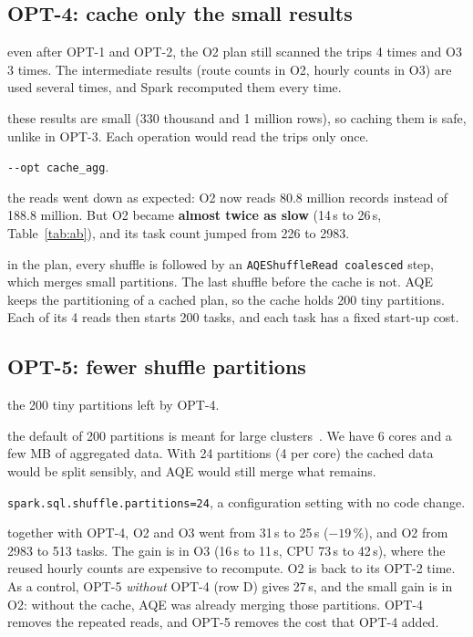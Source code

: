 \documentclass[sigconf]{acmart}
\newcommand{\opt}[1]{\texttt{-{}-opt #1}}
\newenvironment{steps}{\begin{description}[nosep, leftmargin=0pt, font=\normalfont\itshape]}{\end{description}}
\begin{document}
\subsection{OPT-4: cache only the small results}
\begin{steps}
  \item[What we saw:] even after OPT-1 and OPT-2, the O2 plan still scanned the trips 4 times and O3 3 times. The
    intermediate results (route counts in O2, hourly counts in O3) are used several times, and Spark recomputed them
    every time.
  \item[What we expected:] these results are small (330 thousand and 1 million rows), so caching them is safe, unlike
    in OPT-3. Each operation would read the trips only once.
  \item[What we changed:] \opt{cache\_agg}.
  \item[What happened:] the reads went down as expected: O2 now reads 80.8 million records instead of 188.8 million.
    But O2 became \textbf{almost twice as slow} (14\,s to 26\,s, Table~\ref{tab:ab}), and its task count jumped from
    226 to 2983.
  \item[Why:] in the plan, every shuffle is followed by an \texttt{AQEShuffleRead coalesced} step, which merges
    small partitions. The last shuffle before the cache is not. AQE~\cite{sparktuning} keeps the partitioning of a
    cached plan, so the cache holds 200 tiny partitions. Each of its 4 reads then starts 200 tasks, and each task
    has a fixed start-up cost.
\end{steps}

\subsection{OPT-5: fewer shuffle partitions}
\begin{steps}
  \item[What we saw:] the 200 tiny partitions left by OPT-4.
  \item[What we expected:] the default of 200 partitions is meant for large clusters~\cite{sparktuning,awsaqe}. We
    have 6 cores and a few MB of aggregated data. With 24 partitions (4 per core) the cached data would be split
    sensibly, and AQE would still merge what remains.
  \item[What we changed:] \texttt{spark.sql.shuffle.partitions=24}, a configuration setting with no code change.
  \item[What happened:] together with OPT-4, O2 and O3 went from 31\,s to 25\,s ($-19$\,\%), and O2 from 2983 to 513
    tasks. The gain is in O3 (16\,s to 11\,s, CPU 73\,s to 42\,s), where the reused hourly counts are expensive to
    recompute. O2 is back to its OPT-2 time. As a control, OPT-5 \emph{without} OPT-4 (row D) gives 27\,s, and the
    small gain is in O2: without the cache, AQE was already merging those partitions. OPT-4 removes the repeated
    reads, and OPT-5 removes the cost that OPT-4 added.
\end{steps}
\end{document}
